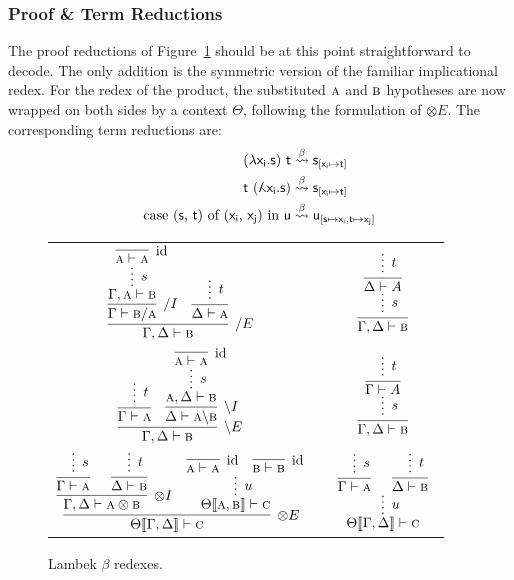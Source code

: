 \subsubsection{Proof \& Term Reductions}
The proof reductions of Figure~\ref{figure:lambek_proof_reductions} should be at this point straightforward to decode.
The only addition is the symmetric version of the familiar implicational redex.
For the redex of the product, the substituted $\smallprop{A}$ and $\smallprop{B}$ hypotheses are now wrapped on both sides by a context $\Theta$, following the formulation of $\otimes E$.
The corresponding term reductions are:
\begin{align*}
(\term{\lambda x_i .s})~\term{t} & \bred \term{s}_{[\term{x_i } \mapsto \term{t}]}\\
\term{t}~(\term{\adbmal x_i .s}) & \bred \term{s}_{[\term{x_i } \mapsto \term{t}]}\\
\cterm{case (\smallterm{s}, \smallterm{t}) of (\smallterm{x_i }, \smallterm{x_j}) in \smallterm{u}} & \bred \term{u_{[\term{s} \mapsto \term{x_i }, \term{t} \mapsto \term{x_j}]}}\\
\end{align*}

\begin{figure}
	\centering
	\begin{tabularx}{0.95\textwidth}{@{}ccc@{}}
	$\infer[\divright E]{\Gamma, \Delta \vdash \prop{B}}{
	\infer[\divright I]{\Gamma \vdash \prop{B} \divright \prop{A}}{
		\infer*[s]{\Gamma, \prop{A} \vdash \prop{B}}{
				\infer[\Ax]{\prop{A} \vdash \prop{A}}{} 
			}
		}
		&
		\infer{\Delta \vdash \prop{A}}{
			\infer*[t]{}{}
		}
	}$
	&
	\raisebox{20pt}{$\implies$}
	&
	$ 
	\infer[]{\Gamma, \Delta \vdash \prop{B}}{
		\infer*[s]{}{
		\infer[]{\Delta \vdash A}{
			\infer*[t]{}{}
		}}
	}
	$\\[\smallsep]
	$\infer[\divleft E]{\Gamma, \Delta \vdash \prop{B}}{
		\infer{\Gamma \vdash \prop{A}}{
			\infer*[t]{}{}
		}
		&
		\infer[\divleft I]{\Delta \vdash \prop{A} \divleft \prop{B}}{
			\infer*[s]{\prop{A}, \Delta \vdash \prop{B}}{
				\infer[\Ax]{\prop{A} \vdash \prop{A}}{} 
			}
		}
	}$
	&
	\raisebox{20pt}{$\implies$}
	&
	$ 
	\infer[]{\Gamma, \Delta \vdash \prop{B}}{
		\infer*[s]{}{
		\infer[]{\Gamma \vdash A}{
			\infer*[t]{}{}
		}}
	}
	$\\[\smallsep]
	$
	\infer[\otimes E]{\Theta\ctx{\Gamma, \Delta} \vdash \prop{C}}{
		\infer[\otimes I]{\Gamma, \Delta \vdash \prop{A} \otimes \prop{B}}{
			\infer[]{\Gamma \vdash \prop{A}}{\infer*[s]{}{}}
			&
			\infer[]{\Delta \vdash \prop{B}}{\infer*[t]{}{}}
		}		
		&
		\infer*[u]{\Theta\ctx{\prop{A}, \prop{B}} \vdash \prop{C}}{
			\infer[\Ax]{\prop{A} \vdash \prop{A}}{}
			& 
			\infer[\Ax]{\prop{B} \vdash \prop{B}}{}
		}
	}
	$
	&
	\raisebox{20pt}{$\implies$}
	&
	$
	\infer*[u]{\Theta\ctx{\Gamma, \Delta} \vdash \prop{C}}{
		\infer[]{\Gamma \vdash \prop{A}}{
			\infer*[s]{}{}
		}
		&
		\infer[]{\Delta \vdash \prop{B}}{
			\infer*[t]{}{}
		}
	}
	$
	\end{tabularx}
	\caption{Lambek $\beta$ redexes.}
	\label{figure:lambek_proof_reductions}
\end{figure}

